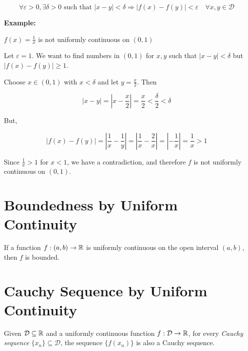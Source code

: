 \[
    \forall \varepsilon > 0, \exists \delta > 0 \text{ such that } |x - y| < \delta \Rightarrow |f(x) - f(y)| < \varepsilon \quad \forall x, y \in \mathcal{D}
\]

\textbf{Example:}

\(f(x) = \frac{1}{x}\) is not uniformly continuous on \((0, 1)\) 

Let \(\varepsilon = 1\). We want to find numbers in \((0,1)\) for \(x,y\) such that \(|x - y| < \delta\) but \(|f(x) - f(y)| \ge 1\). 

Choose \(x \in (0,1)\) with \(x < \delta\) and let \(y = \frac{x}{2}\). Then 

\[
    |x - y| = |x - \frac{x}{2}| = \frac{x}{2} < \frac{\delta}{2} < \delta
\]

But, 

\[
    |f(x) - f(y)| = \left|\frac{1}{x} - \frac{1}{y}\right| = \left|\frac{1}{x} - \frac{2}{x}\right| = \left|-\frac{1}{x}\right| = \frac{1}{x} > 1
\]

Since \(\frac{1}{x} > 1\) for \(x < 1\), we have a contradiction, and therefore \(f\) is not uniformly continuous on \((0,1)\).

\section{Boundedness by Uniform Continuity}

If a function \(f: (a, b) \to \mathbb{R}\) is uniformly continuous on the open interval \((a, b)\), then \(f\) is bounded.

\section{Cauchy Sequence by Uniform Continuity}

Given \(\mathcal{D} \subseteq \mathbb{R}\) and a uniformly continuous function \(f: \mathcal{D} \to \mathbb{R}\),
for every \emph{Cauchy sequence} \(\{x_n\} \subseteq \mathcal{D}\), the sequence \(\{f(x_n)\}\) is also a Cauchy sequence.
